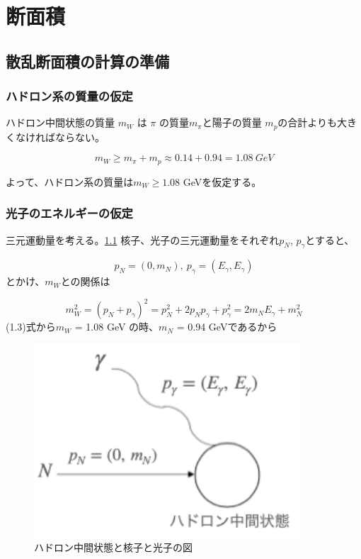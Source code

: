\chapter{断面積} \label{cha:cross_section}
\section{散乱断面積の計算の準備}
\subsection{ハドロン系の質量の仮定}
ハドロン中間状態の質量 $m_W$ は $\pi$ の質量$m_\pi$と陽子の質量 $m_p$の合計よりも大きくなければならない。

\begin{equation}
    m_W \geq m_\pi + m_p \approx 0.14 + 0.94 = 1.08 \ GeV
\end{equation}

よって、ハドロン系の質量は$m_W \geq 1.08$ GeVを仮定する。


\subsection{光子のエネルギーの仮定}
三元運動量を考える。\ref{fig:test2}
核子、光子の三元運動量をそれぞれ$p_N$, $p_\gamma$とすると、

\begin{equation}
    p_N = (0, m_N),\  p_\gamma = (E_\gamma, E_\gamma)
\end{equation}
とかけ、$m_W$との関係は

\begin{equation}
    m_W^2 = (p_N + p_\gamma)^2 = p_N^2 + 2p_N p_\gamma + p_\gamma^2
    = 2m_N E_\gamma + m_N^2
\end{equation}
(1.3)式から$m_W$ = 1.08 GeV の時、$m_N$ = 0.94 GeVであるから

\begin{figure}[H]
    \centering
    \includegraphics[width=10cm]{img/diagram_momentum.png}
    \caption{ハドロン中間状態と核子と光子の図}
    \label{fig:test2}
\end{figure}

